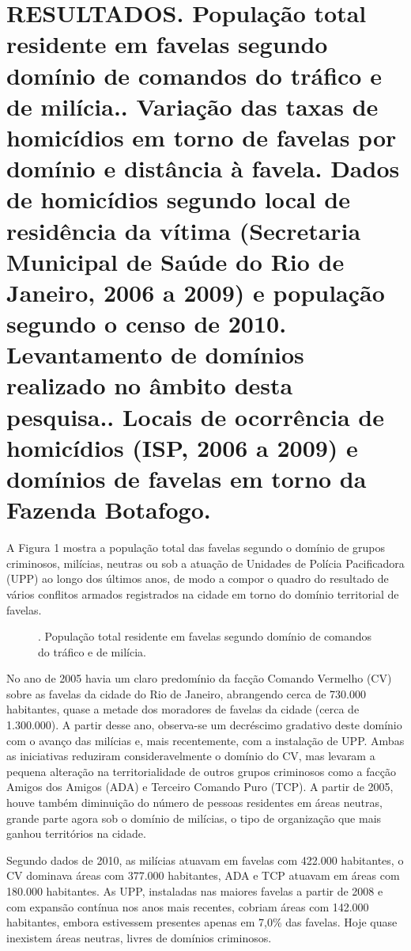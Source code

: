 \documentclass{article}
\begin{document}
\section{RESULTADOS. População total residente em favelas segundo domínio de
comandos do tráfico e de milícia.. Variação das taxas de homicídios em torno de
favelas por domínio e distância à favela. Dados de homicídios segundo local de
residência da vítima (Secretaria Municipal de Saúde do Rio de Janeiro, 2006 a
2009) e população segundo o censo de 2010. Levantamento de domínios realizado no
âmbito desta pesquisa.. Locais de ocorrência de homicídios (ISP, 2006 a 2009) e
domínios de favelas em torno da Fazenda Botafogo.}

A Figura 1 mostra a população total das favelas segundo o domínio de grupos
criminosos, milícias, neutras ou sob a atuação de Unidades de Polícia
Pacificadora (UPP) ao longo dos últimos anos, de modo a compor o quadro do
resultado de vários conflitos armados registrados na cidade em torno do domínio
territorial de favelas.

\begin{figure}
\caption{. População total residente em favelas segundo domínio de comandos do
tráfico e de milícia.}
\end{figure}

No ano de 2005 havia um claro predomínio da facção Comando Vermelho (CV) sobre
as favelas da cidade do Rio de Janeiro, abrangendo cerca de 730.000 habitantes,
quase a metade dos moradores de favelas da cidade (cerca de 1.300.000). A partir
desse ano, observa-se um decréscimo gradativo deste domínio com o avanço das
milícias e, mais recentemente, com a instalação de UPP. Ambas as iniciativas
reduziram consideravelmente o domínio do CV, mas levaram a pequena alteração na
territorialidade de outros grupos criminosos como a facção Amigos dos Amigos
(ADA) e Terceiro Comando Puro (TCP). A partir de 2005, houve também diminuição
do número de pessoas residentes em áreas neutras, grande parte agora sob o
domínio de milícias, o tipo de organização que mais ganhou territórios na
cidade.

Segundo dados de 2010, as milícias atuavam em favelas com 422.000 habitantes, o
CV dominava áreas com 377.000 habitantes, ADA e TCP atuavam em áreas com 180.000
habitantes. As UPP, instaladas nas maiores favelas a partir de 2008 e com
expansão contínua nos anos mais recentes, cobriam áreas com 142.000 habitantes,
embora estivessem presentes apenas em 7,0\% das favelas. Hoje quase inexistem
áreas neutras, livres de domínios criminosos.
\end{document}
